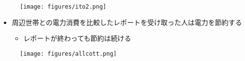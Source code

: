 \documentclass[
  xelatex,
  ja=standard]{bxjsarticle}
\providecommand{\tightlist}{%
  \setlength{\itemsep}{0pt}\setlength{\parskip}{0pt}}\usepackage{longtable,booktabs,array}
\begin{document}
\begin{figure}[htpb]

{\centering \texttt{[image: figures/ito2.png]}

}

\caption{\citet{ito2018}}

\end{figure}

\begin{itemize}
\tightlist
\item
  周辺世帯との電力消費を比較したレポートを受け取った人は電力を節約する\citep{allcott2014}

  \begin{itemize}
  \tightlist
  \item
    レポートが終わっても節約は続ける
  \end{itemize}
\end{itemize}

\begin{figure}[htpb]

{\centering \texttt{[image: figures/allcott.png]}

}

\caption{\citet{allcott2014}}

\end{figure}


  
\end{document}
